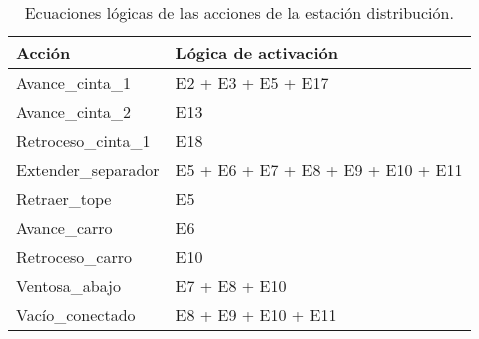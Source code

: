 \begin{table}[H]
\begin{center}

\renewcommand{\arraystretch}{1.5}
\begin{tabular}{|M{5cm}|M{8.5cm}|}
\hline
\textbf{Acción} & 
\textbf{Lógica de activación} \\ 
\hline
Avance\_cinta\_1 &  E2 + E3 + E5 + E17 \\
\hline
Avance\_cinta\_2 &  E13 \\
\hline
Retroceso\_cinta\_1 & E18 \\
\hline
Extender\_separador &  E5 + E6 + E7 + E8 + E9 + E10 + E11 \\
\hline
Retraer\_tope &  E5 \\
\hline
Avance\_carro &  E6 \\
\hline
Retroceso\_carro &  E10 \\
\hline
Ventosa\_abajo &  E7 + E8 + E10 \\
\hline
Vacío\_conectado & E8 + E9 + E10 + E11 \\
\hline


\end{tabular}

\caption{Ecuaciones lógicas de las acciones de la estación distribución.}
\label{cuadro:acciones_distribucion}
\end{center}
\end{table}


